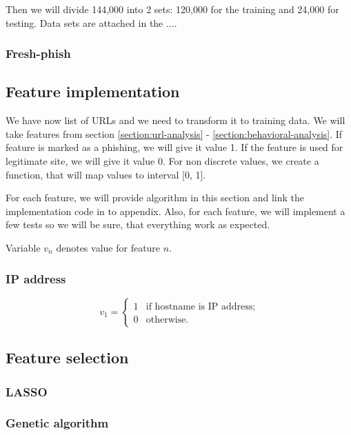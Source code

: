 \documentclass[
  digital, %
  oneside, %
  table,   %
  nolof,     %
  nolot,     %
]{fithesis3}
\newcounter{feature}
\begin{document}
Then we will divide 144,000 into 2 sets: 120,000 for the training and 24,000 for testing. Data sets are attached in the ....

\subsubsection{Fresh-phish}

\subsection{Feature implementation}
We have now list of URLs and we need to transform it to training data. We will take features from section \ref{section:url-analysis} - \ref{section:behavioral-analysis}. If feature is marked as a phishing, we will give it value 1. If the feature is used for legitimate site, we will give it value 0. For non discrete values, we create a function, that will map values to interval [0, 1].

For each feature, we will provide algorithm in this section and link the implementation code in to appendix. Also, for each feature, we will implement a few tests so we will be sure, that everything work as expected.

Variable $v_n$ denotes value for feature $n$.

\subsubsection{IP address}

  \[
    v_1 =\left\{
                \begin{array}{lr}
                  1 & \mbox{if hostname is IP address};\\
                  0 & \mbox{otherwise}.
                  
                \end{array}
              \right.
  \]

\subsection{Feature selection}
\subsubsection{LASSO}
\subsubsection{Genetic algorithm}
\end{document}
